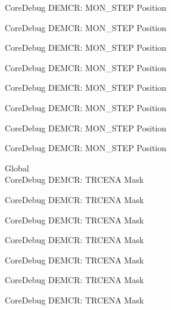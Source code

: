 \begin{DoxyRefList}
\label{deprecated__deprecated000500}%
%
Core\+Debug DEMCR\+: MON\+\_\+\+STEP Position 

\label{deprecated__deprecated000602}%
%
Core\+Debug DEMCR\+: MON\+\_\+\+STEP Position 

\label{deprecated__deprecated000727}%
%
Core\+Debug DEMCR\+: MON\+\_\+\+STEP Position 

\label{deprecated__deprecated000871}%
%
Core\+Debug DEMCR\+: MON\+\_\+\+STEP Position 

\label{deprecated__deprecated001013}%
%
Core\+Debug DEMCR\+: MON\+\_\+\+STEP Position 

\label{deprecated__deprecated001089}%
%
Core\+Debug DEMCR\+: MON\+\_\+\+STEP Position 

\label{deprecated__deprecated001178}%
%
Core\+Debug DEMCR\+: MON\+\_\+\+STEP Position 

\label{deprecated__deprecated001280}%
%
Core\+Debug DEMCR\+: MON\+\_\+\+STEP Position  
\item[Global \doxylink{group___c_m_s_i_s___core_debug_ga5e99652c1df93b441257389f49407834}{Core\+Debug\+\_\+\+DEMCR\+\_\+\+TRCENA\+\_\+\+Msk} ]\hfill \\
\label{deprecated__deprecated000046}%
%
Core\+Debug DEMCR\+: TRCENA Mask 

\label{deprecated__deprecated000190}%
%
Core\+Debug DEMCR\+: TRCENA Mask 

\label{deprecated__deprecated000332}%
%
Core\+Debug DEMCR\+: TRCENA Mask 

\label{deprecated__deprecated000408}%
%
Core\+Debug DEMCR\+: TRCENA Mask 

\label{deprecated__deprecated000497}%
%
Core\+Debug DEMCR\+: TRCENA Mask 

\label{deprecated__deprecated000599}%
%
Core\+Debug DEMCR\+: TRCENA Mask 

\label{deprecated__deprecated000724}%
%
Core\+Debug DEMCR\+: TRCENA Mask 


\end{DoxyRefList}
